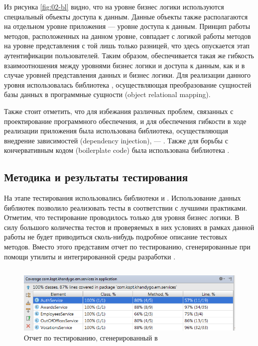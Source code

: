 Из рисунка \ref{fig:02-bl} видно, что на уровне бизнес логики используются специальный объекты доступа к данным. Данные объекты также 
располагаются на отдельном уровне приложения --- уровне доступа к данным. Принцип работы методов, расположенных на данном уровне, совпадает
с логикой работы методов на уровне представления с той лишь только разницей, что здесь опускается этап аутентификации пользователей. 
Таким образом, обеспечивается такая же гибкость взаимоотношения между уровнями бизнес логики и доступа к данным, как и в случае уровней
представления данных и бизнес логики. Для реализации данного уровня использовалась библиотека , осуществляющая 
преобразование сущностей базы данных в программные сущности (object relational mapping). 

Также стоит отметить, что для избежания различных проблем, связанных с проектирование программного обеспечения, и для обеспечения 
гибкости в ходе реализации приложения была использована библиотека, осуществляющая внедрение зависимостей (dependency injection), --- 
. Также для борьбы с кончервативным кодом (boilerplate code) была использована библиотека .

\subsection{Методика и результаты тестирования}

На этапе тестирования использовались библиотеки  и . Использование данных библиотек позволило реализовать тесты
в соответствии с лучшими практиками. Отметим, что тестирование проводилось только для уровня бизнес логики. В силу большого количества
тестов и проверяемых в них условиях в рамках данной работы не будет приводиться сколь-нибудь подробное описание тестовых методов. Вместо
этого представим отчет по тестированию, сгенерированные при помощи утилиты  и интегрированной среды разработки 
.

\begin{center}
    \inputminted{console}{resources/02_implementation/05_tests}
\end{center}

\begin{figure}[H]
    \centering
    \includegraphics[width=\textwidth]{resources/02_implementation/06_tests.png}
    \caption{Отчет по тестированию, сгенерированный в }
    \label{fig:02-test}
\end{figure}

